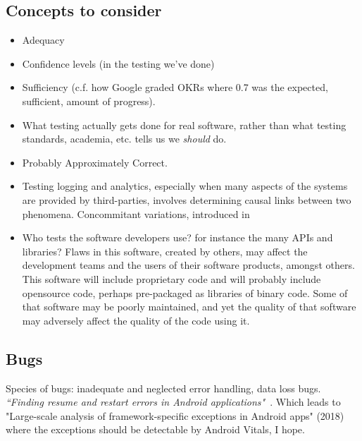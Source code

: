 \subsection{Concepts to consider}
\begin{itemize}
    \item Adequacy
    \item Confidence levels (in the testing we've done)
    \item Sufficiency (c.f. how Google graded OKRs where 0.7 was the expected, sufficient, amount of progress).
    \item What testing actually gets done for real software, rather than what testing standards, academia, etc. tells us we \emph{should} do.
    \item Probably Approximately Correct.
    \item Testing logging and analytics, especially when many aspects of the systems are provided by third-parties, involves determining causal links between two phenomena. Concommitant variations, introduced in~\cite{mill1884system}
    \item Who tests the software developers use? for instance the many APIs and libraries? Flaws in this software, created by others, may affect the development teams and the users of their software products, amongst others. This software will include proprietary code and will probably include opensource code, perhaps pre-packaged as libraries of binary code. Some of that software may be poorly maintained, and yet the quality of that software may adversely affect the quality of the code using it. 
\end{itemize}



\subsection{Bugs}
Species of bugs: inadequate and neglected error handling, data loss bugs. \emph{``Finding resume and restart errors in Android applications"}~\cite{shan2016finding}. Which leads to "Large-scale analysis of framework-specific exceptions in Android apps" (2018) where the exceptions should be detectable by Android Vitals, I hope.

